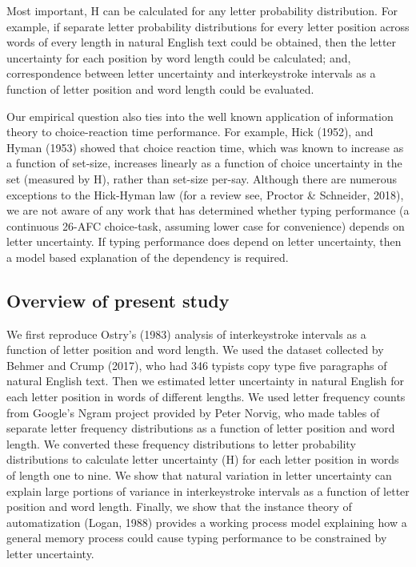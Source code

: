 \documentclass[floatsintext,man]{apa6}
\theoremstyle{definition}
\theoremstyle{definition}
\theoremstyle{definition}
\theoremstyle{remark}
\begin{document}
Most important, H can be calculated for any letter probability
distribution. For example, if separate letter probability distributions
for every letter position across words of every length in natural
English text could be obtained, then the letter uncertainty for each
position by word length could be calculated; and, correspondence between
letter uncertainty and interkeystroke intervals as a function of letter
position and word length could be evaluated.

Our empirical question also ties into the well known application of
information theory to choice-reaction time performance. For example,
Hick (1952), and Hyman (1953) showed that choice reaction time, which
was known to increase as a function of set-size, increases linearly as a
function of choice uncertainty in the set (measured by H), rather than
set-size per-say. Although there are numerous exceptions to the
Hick-Hyman law (for a review see, Proctor \& Schneider, 2018), we are
not aware of any work that has determined whether typing performance (a
continuous 26-AFC choice-task, assuming lower case for convenience)
depends on letter uncertainty. If typing performance does depend on
letter uncertainty, then a model based explanation of the dependency is
required.

\subsection{Overview of present study}\label{overview-of-present-study}

We first reproduce Ostry's (1983) analysis of interkeystroke intervals
as a function of letter position and word length. We used the dataset
collected by Behmer and Crump (2017), who had 346 typists copy type five
paragraphs of natural English text. Then we estimated letter uncertainty
in natural English for each letter position in words of different
lengths. We used letter frequency counts from Google's Ngram project
provided by Peter Norvig, who made tables of separate letter frequency
distributions as a function of letter position and word length. We
converted these frequency distributions to letter probability
distributions to calculate letter uncertainty (H) for each letter
position in words of length one to nine. We show that natural variation
in letter uncertainty can explain large portions of variance in
interkeystroke intervals as a function of letter position and word
length. Finally, we show that the instance theory of automatization
(Logan, 1988) provides a working process model explaining how a general
memory process could cause typing performance to be constrained by
letter uncertainty.
\end{document}
